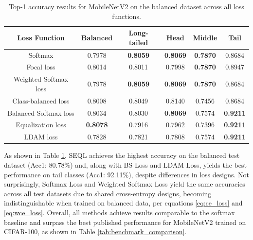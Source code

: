 \begin{table}[H]
    \centering
    \caption{Top-1 accuracy results for MobileNetV2 on the balanced dataset across all loss functions.}
    \begin{tabular}{cccccc}
        \toprule
        Loss Function & Balanced & Long-tailed & Head & Middle & Tail \\ 
        \midrule
        Softmax   & 0.7978   & \textbf{0.8059} & \textbf{0.8069} & \textbf{0.7870} & 0.8684 \\
        Focal loss   & 0.8014   & 0.8011 & 0.7998 & \textbf{0.7870} & 0.8947 \\
        Weighted Softmax loss   & 0.7978   & \textbf{0.8059} & \textbf{0.8069} & \textbf{0.7870} & 0.8684 \\
        Class-balanced loss   & 0.8008   & 0.8049 & 0.8140 & 0.7456 & 0.8684 \\
        Balanced Softmax loss   & 0.8034  & 0.8030 & \textbf{0.8069} & 0.7574 & \textbf{0.9211} \\
        Equalization loss   &  \textbf{0.8078}  & 0.7916 & 0.7962 & 0.7396 & \textbf{0.9211} \\
        LDAM loss   &  0.7828   & 0.7821 & 0.7808 & 0.7574 & \textbf{0.9211} \\
        \bottomrule
    \end{tabular}
    \label{tab:mobilenet_bal_acc1_1}
\end{table}

As shown in Table \ref{tab:mobilenet_bal_acc1_1}, SEQL achieves the highest accuracy on the balanced test dataset (Acc1: 80.78\%) and, along with BS Loss and LDAM Loss, yields the best performance on tail classes (Acc1: 92.11\%), despite differences in loss designs. Not surprisingly, Softmax Loss and Weighted Softmax Loss yield the same accuracies across all test datasets due to shared cross-entropy designs, becoming indistinguishable when trained on balanced data, per equations \eqref{eq:ce_loss} and \eqref{eq:wce_loss}. Overall, all methods achieve results comparable to the softmax baseline and surpass the best published performance for MobileNetV2 trained on CIFAR-100, as shown in Table \ref{tab:benchmark_comparison}.

